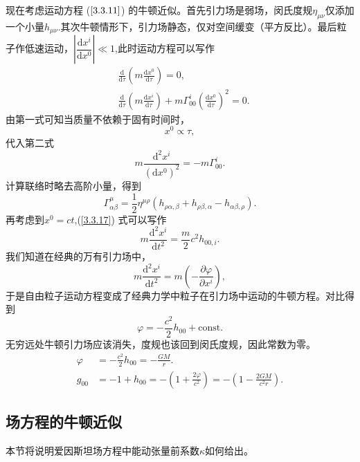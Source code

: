\documentclass[11pt, a4paper, oneside, onecolumn]{ctexart}
\numberwithin{equation}{subsection}
\begin{document}
现在考虑运动方程 ($\ref{3.3.11}$) 的牛顿近似。首先引力场是弱场，闵氏度规$\eta_{\mu\nu}$仅添加一个小量$h_{\mu\nu}$.其次牛顿情形下，引力场静态，仅对空间缓变（平方反比）。最后粒子作低速运动，$\left\vert{}\dfrac{\mathrm{d}x^{i}}{\mathrm{d}x^{0}}\right\vert{}\ll1$,此时运动方程可以写作
\begin{align}
&\frac{\mathrm{d}}{\mathrm{d}\tau}\left(m\frac{\mathrm{d}x^{0}}{\mathrm{d}\tau}\right)=0,\\
&\frac{\mathrm{d}}{\mathrm{d}\tau}\left(m\frac{\mathrm{d}x^{i}}{\mathrm{d}\tau}\right)+m\Gamma_{00}^{i}\left(\frac{\mathrm{d}x^{0}}{\mathrm{d}\tau}\right)^{2}=0.
\end{align}
由第一式可知当质量不依赖于固有时间时，
\begin{equation}
x^{0}\propto{}\tau,
\end{equation}
代入第二式
\begin{equation}
m\frac{\mathrm{d}^{2}x^{i}}{\left(\mathrm{d}x^{0}\right)^{2}}=-m\Gamma_{00}^{i}.\label{3.3.17}
\end{equation}
计算联络时略去高阶小量，得到
\begin{equation}
\Gamma_{\alpha\beta}^{\mu}=\frac{1}{2}\eta^{\mu\rho}\left(h_{\rho\alpha,\beta}+h_{\rho\beta,\alpha}-h_{\alpha\beta,\rho}\right).
\end{equation}
再考虑到$x^{0}=ct$,(\ref{3.3.17}) 式可以写作
\begin{equation}
m\frac{\mathrm{d}^{2}x^{i}}{\mathrm{d}t^{2}}=\frac{m}{2}c^{2}h_{00,i}.
\end{equation}
我们知道在经典的万有引力场中，
\begin{equation}
m\frac{\mathrm{d}^{2}x^{i}}{\mathrm{d}t^{2}}=m\left(-\frac{\partial{}\varphi}{\partial{}x^{i}}\right),
\end{equation}
于是自由粒子运动方程变成了经典力学中粒子在引力场中运动的牛顿方程。对比得到
\begin{equation}
\varphi=-\frac{c^{2}}{2}h_{00}+\text{const}.
\end{equation}
无穷远处牛顿引力场应该消失，度规也该回到闵氏度规，因此常数为零。
\begin{align}
\varphi&=-\frac{c^{2}}{2}h_{00}=-\frac{GM}{r}.\\
g_{00}&=-1+h_{00}=-\left(1+\frac{2\varphi}{c^{2}}\right)=-\left(1-\frac{2GM}{c^{2}r}\right).
\end{align}

\subsection{场方程的牛顿近似}
本节将说明爱因斯坦场方程中能动张量前系数$\kappa$如何给出。
\end{document}
